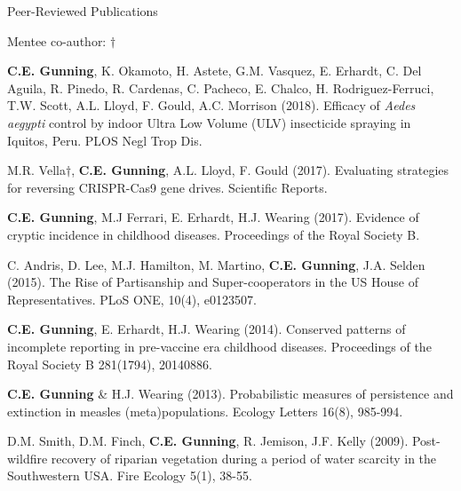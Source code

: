 \documentclass{resume} %
\begin{document}
\begin{rSection}{Peer-Reviewed Publications}

Mentee co-author: $\dagger$

{\bf C.E. Gunning}, K. Okamoto, H. Astete, G.M. Vasquez, E. Erhardt, 
C. Del Aguila, R. Pinedo, R. Cardenas, C. Pacheco, E. Chalco, 
H. Rodriguez-Ferruci, T.W. Scott, A.L. Lloyd, F. Gould, A.C. Morrison (2018).
Efficacy of {\em Aedes aegypti} control by indoor Ultra Low Volume (ULV)
insecticide spraying in Iquitos, Peru. PLOS Negl Trop Dis.

M.R. Vella$\dagger$, {\bf C.E. Gunning}, A.L. Lloyd, F. Gould (2017).
Evaluating strategies for reversing CRISPR-Cas9 gene drives.
Scientific Reports.

{\bf C.E. Gunning}, M.J Ferrari, E. Erhardt, H.J. Wearing (2017).
Evidence of cryptic incidence in childhood diseases. 
Proceedings of the Royal Society B.

C. Andris, D. Lee, M.J.  Hamilton, M. Martino, {\bf C.E. Gunning},  J.A. Selden (2015).
The Rise of Partisanship and Super-cooperators in the US House of Representatives.
PLoS ONE, 10(4), e0123507.

{\bf C.E. Gunning}, E. Erhardt, H.J. Wearing (2014). 
Conserved patterns of incomplete reporting in pre-vaccine era childhood diseases.
Proceedings of the Royal Society B 281(1794), 20140886. 

{\bf C.E. Gunning} \& H.J. Wearing (2013). Probabilistic measures of persistence
and extinction in measles (meta)populations. Ecology Letters 16(8), 985-994.

D.M. Smith, D.M. Finch, {\bf C.E. Gunning}, R. Jemison, J.F. Kelly (2009). Post-wildfire recovery of riparian vegetation during a period of water scarcity in the Southwestern USA. Fire Ecology 5(1), 38-55.
\end{rSection}
\end{document}
